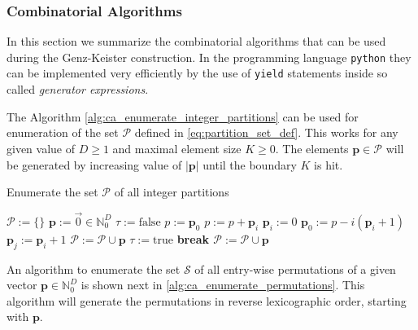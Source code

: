 \documentclass[a4paper,10pt]{article}
\begin{document}
\subsubsection{Combinatorial Algorithms}


In this section we summarize the combinatorial algorithms that
can be used during the Genz-Keister construction. In the programming
language \texttt{python} they can be implemented very efficiently by
the use of \texttt{yield} statements inside so called \emph{generator expressions}.

The Algorithm \ref{alg:ca_enumerate_integer_partitions} can
be used for enumeration of the set $\mathcal{P}$ defined in
\eqref{eq:partition_set_def}. This works for any given value
of $D \geq 1$ and maximal element size $K \geq 0$. The elements
$\mathbf{p} \in \mathcal{P}$ will be generated by increasing value
of $|\mathbf{p}|$ until the boundary $K$ is hit.

\begin{algorithm}[h!]
  \caption{Enumerate the set $\mathcal{P}$ of all integer partitions}
  \label{alg:ca_enumerate_integer_partitions}
  \begin{algorithmic}
      \State $\mathcal{P} := \{\}$
      \State $\mathbf{p} := \vec{0} \in \mathbb{N}_{0}^{D}$
        \State $\tau := \mathrm{false}$
        \State $p := \mathbf{p}_{0}$
          \State $p := p + \mathbf{p}_i$
            \State $\mathbf{p}_{i} := 0$
          \Else
            \State $\mathbf{p}_{0} := p - i (\mathbf{p}_{i} + 1)$
              \State $\mathbf{p}_{j} := \mathbf{p}_{i} + 1$
            \EndFor
            \State $\mathcal{P} := \mathcal{P} \cup \mathbf{p}$
            \State $\tau := \mathrm{true}$
            \State \bf{break}
          \EndIf
        \EndFor
            \State $\mathcal{P} := \mathcal{P} \cup \mathbf{p}$
          \EndIf
        \EndIf
      \EndWhile
    \EndProcedure
  \end{algorithmic}
\end{algorithm}

An algorithm to enumerate the set $\mathcal{S}$ of all entry-wise
permutations of a given vector $\mathbf{p} \in \mathbb{N}_{0}^{D}$
is shown next in \ref{alg:ca_enumerate_permutations}. This algorithm
will generate the permutations in reverse lexicographic order,
starting with $\mathbf{p}$.
\end{document}
